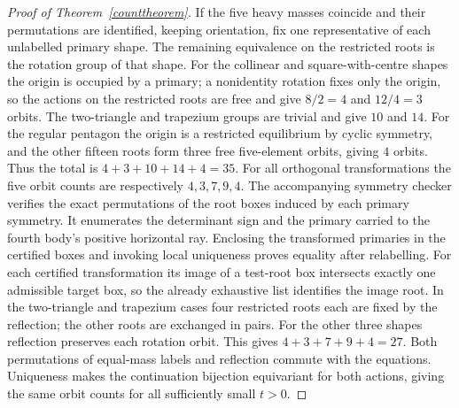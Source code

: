 \documentclass[11pt]{article}
\begin{document}
\begin{proof}[Proof of Theorem~\ref{counttheorem}]
If the five heavy masses coincide and their permutations are identified, keeping orientation, fix one representative of each unlabelled primary shape. The remaining equivalence on the restricted roots is the rotation group of that shape. For the collinear and square-with-centre shapes the origin is occupied by a primary; a nonidentity rotation fixes only the origin, so the actions on the restricted roots are free and give $8/2=4$ and $12/4=3$ orbits. The two-triangle and trapezium groups are trivial and give $10$ and $14$. For the regular pentagon the origin is a restricted equilibrium by cyclic symmetry, and the other fifteen roots form three free five-element orbits, giving $4$ orbits. Thus the total is $4+3+10+14+4=35$. For all orthogonal transformations the five orbit counts are respectively $4,3,7,9,4$. The accompanying symmetry checker verifies the exact permutations of the root boxes induced by each primary symmetry. It enumerates the determinant sign and the primary carried to the fourth body's positive horizontal ray. Enclosing the transformed primaries in the certified boxes and invoking local uniqueness proves equality after relabelling. For each certified transformation its image of a test-root box intersects exactly one admissible target box, so the already exhaustive list identifies the image root. In the two-triangle and trapezium cases four restricted roots each are fixed by the reflection; the other roots are exchanged in pairs. For the other three shapes reflection preserves each rotation orbit. This gives $4+3+7+9+4=27$. Both permutations of equal-mass labels and reflection commute with the equations. Uniqueness makes the continuation bijection equivariant for both actions, giving the same orbit counts for all sufficiently small $t>0$.
\end{proof}
\end{document}
